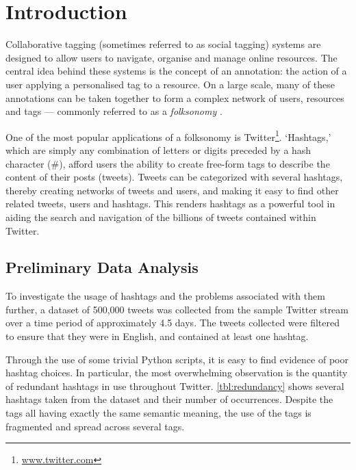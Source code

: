 \documentclass[11pt,a4paper]{report}
\begin{document}
\pagebreak

\setcounter{page}{1}

\chapter{Introduction}
\label{chap:introduction}
Collaborative tagging (sometimes referred to as social tagging) systems are designed to allow users to navigate, organise and manage online resources. The central idea behind these systems is the concept of an annotation: the action of a user applying a personalised tag to a resource. On a large scale, many of these annotations can be taken together to form a complex network of users, resources and tags --- commonly referred to as a \emph{folksonomy} \parencite{Xu:2008}.

One of the most popular applications of a folksonomy is Twitter\footnote{\url{www.twitter.com}}. `Hashtags,' which are simply any combination of letters or digits preceded by a hash character (\#), afford users the ability to create free-form tags to describe the content of their posts (tweets). Tweets can be categorized with several hashtags, thereby creating networks of tweets and users, and making it easy to find other related tweets, users and hashtags. This renders hashtags as a powerful tool in aiding the search and navigation of the billions of tweets contained within Twitter.

\section{Preliminary Data Analysis}

To investigate the usage of hashtags and the problems associated with them further, a dataset of 500,000 tweets was collected from the sample Twitter stream over a time period of approximately 4.5 days. The tweets collected were filtered to ensure that they were in English, and contained at least one hashtag.

Through the use of some trivial Python scripts, it is easy to find evidence of poor hashtag choices. In particular, the most overwhelming observation is the quantity of redundant hashtags in use throughout Twitter. \autoref{tbl:redundancy} shows several hashtags taken from the dataset and their number of occurrences. Despite the tags all having exactly the same semantic meaning, the use of the tags is fragmented and spread across several tags.
\end{document}
